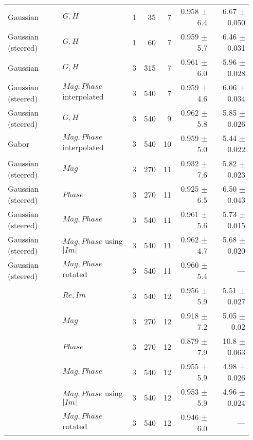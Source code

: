 \begin{tabularx}{\linewidth}{p{3cm} p{3cm} r r r r r}
Gaussian& $G, H$                    & 1 &     35    &  7     & 0.958 $\pm$ 6.4 & 6.67 $\pm$ 0.050   \\
Gaussian (steered)& $G,H$           & 1 &     60    &  7     & 0.959 $\pm$ 5.7   & 6.46 $\pm$ 0.031 \\
Gaussian& $G, H$                    & 3 &    315    &  7     & 0.961 $\pm$ 6.0 & 5.96 $\pm$ 0.028 \\
Gaussian (steered)& $Mag, Phase$ interpolated
                                    & 3 &    540    &  7     & 0.959 $\pm$ 4.6     & 6.06 $\pm$ 0.034 \\
Gaussian (steered)& $G,H$           & 3 &    540    &  9     & 0.962 $\pm$ 5.8   & 5.85 $\pm$ 0.026 \\

Gabor   & $Mag, Phase$ interpolated & 3 &    540    & 10     & 0.959 $\pm$ 5.0     & 5.44 $\pm$ 0.022 \\

Gaussian (steered)& $Mag$           & 3 &    270    & 11     & 0.932 $\pm$ 7.6     & 5.82 $\pm$ 0.023 \\
Gaussian (steered)& $Phase$         & 3 &    270    & 11     & 0.925 $\pm$ 6.5    & 6.50 $\pm$ 0.043 \\
Gaussian (steered)& $Mag, Phase$    & 3 &    540    & 11     & 0.961 $\pm$ 5.6     & 5.73 $\pm$ 0.015 \\
Gaussian (steered)& $Mag,Phase$ using $|Im|$       
                                    & 3 &    540    & 11     & 0.962 $\pm$ 4.7     & 5.68 $\pm$ 0.020 \\
Gaussian (steered)& $Mag,Phase$ rotated  
                                    & 3 &    540    & 11     & 0.960 $\pm$ 5.4     & --- \\

\dtcwt{}& $Re,Im$                   & 3 &    540    & 12     & 0.956 $\pm$ 5.9   & 5.51 $\pm$ 0.027 \\

\dtcwt{}& $Mag$                     & 3 &    270    & 12     & 0.918 $\pm$ 7.2     & 5.05 $\pm$  0.02 \\
\dtcwt{}& $Phase$                   & 3 &    270    & 12     & 0.879 $\pm$ 7.9     & 10.8 $\pm$  0.063 \\
\dtcwt{}& $Mag,Phase$               & 3 &    540    & 12     & 0.955 $\pm$ 5.9     & 4.98 $\pm$  0.026 \\
\dtcwt{}& $Mag,Phase$ using $|Im|$  & 3 &    540    & 12     & 0.953 $\pm$ 5.9     & 4.96 $\pm$  0.024 \\
\dtcwt{}& $Mag,Phase$ rotated       & 3 &    540    & 12     & 0.946 $\pm$ 6.0     & --- \\


\end{tabularx}
